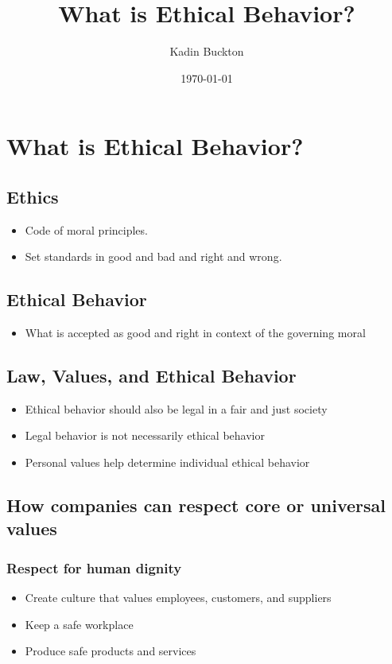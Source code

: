 \documentclass[11pt]{article}
\author{Kadin Buckton}
\date{\today}
\title{What is Ethical Behavior?}
\begin{document}
\maketitle

\section*{What is Ethical Behavior?}
\label{sec:org79e441e}

\subsection*{Ethics}
\label{sec:orgc6bcf81}
\begin{itemize}
\item Code of moral principles.
\item Set standards in good and bad and right and wrong.
\end{itemize}

\subsection*{Ethical Behavior}
\label{sec:org0370bfc}
\begin{itemize}
\item What is accepted as good and right in context of the governing moral
\end{itemize}

\subsection*{Law, Values, and Ethical Behavior}
\label{sec:org2475db3}
\begin{itemize}
\item Ethical behavior should also be legal in a fair and just society
\item Legal behavior is not necessarily ethical behavior
\item Personal values help determine individual ethical behavior
\end{itemize}

\subsection*{How companies can respect core or universal values}
\label{sec:org33a56e2}

\subsubsection*{Respect for human dignity}
\label{sec:org24b4689}
\begin{itemize}
\item Create culture that values employees, customers, and suppliers
\item Keep a safe workplace
\item Produce safe products and services
\end{itemize}
\end{document}
